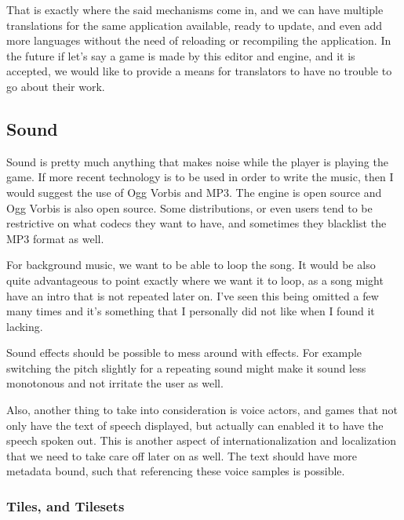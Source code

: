 That is exactly where the said mechanisms come in, and we can have multiple
translations for the same application available, ready to update, and even add
more languages without the need of reloading or recompiling the application. In
the future if let's say a game is made by this editor and engine, and it is
accepted, we would like to provide a means for translators to have no trouble to
go about their work.

\subsection{Sound}

Sound is pretty much anything that makes noise while the player is playing the
game. If more recent technology is to be used in order to write the music, then
I would suggest the use of Ogg Vorbis and MP3. The engine is open source and Ogg
Vorbis is also open source. Some distributions, or even users tend to be
restrictive on what codecs they want to have, and sometimes they blacklist the
MP3 format as well.

For background music, we want to be able to loop the song. It would be also
quite advantageous to point exactly where we want it to loop, as a song might
have an intro that is not repeated later on. I've seen this being omitted a few
many times and it's something that I personally did not like when I found it
lacking.

Sound effects should be possible to mess around with effects. For example
switching the pitch slightly for a repeating sound might make it sound less
monotonous and not irritate the user as well.

Also, another thing to take into consideration is voice actors, and games that
not only have the text of speech displayed, but actually can enabled it to have
the speech spoken out. This is another aspect of internationalization and
localization that we need to take care off later on as well. The text should
have more metadata bound, such that referencing these voice samples is possible.

\subsubsection{Tiles, and Tilesets}

